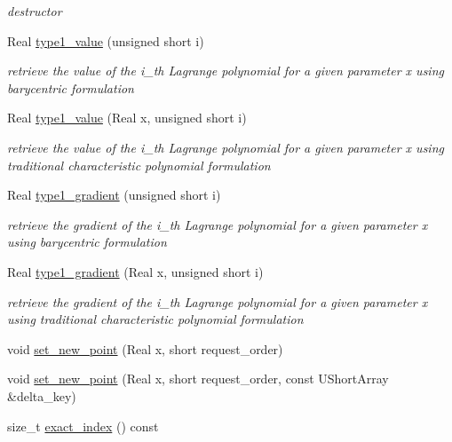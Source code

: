 \begin{DoxyCompactItemize}
\begin{DoxyCompactList}\small\item\em destructor \end{DoxyCompactList}\item 
Real \hyperlink{classPecos_1_1LagrangeInterpPolynomial_a2b603ac91089253b885e55fde37cd9c3}{type1\+\_\+value} (unsigned short i)
\begin{DoxyCompactList}\small\item\em retrieve the value of the i\+\_\+th Lagrange polynomial for a given parameter x using barycentric formulation \end{DoxyCompactList}\item 
Real \hyperlink{classPecos_1_1LagrangeInterpPolynomial_abb79c6ea3bd58a7ca9c4b3bfdd85be9c}{type1\+\_\+value} (Real x, unsigned short i)
\begin{DoxyCompactList}\small\item\em retrieve the value of the i\+\_\+th Lagrange polynomial for a given parameter x using traditional characteristic polynomial formulation \end{DoxyCompactList}\item 
Real \hyperlink{classPecos_1_1LagrangeInterpPolynomial_adc62caa2483812a460fa3bd6d5dd79df}{type1\+\_\+gradient} (unsigned short i)
\begin{DoxyCompactList}\small\item\em retrieve the gradient of the i\+\_\+th Lagrange polynomial for a given parameter x using barycentric formulation \end{DoxyCompactList}\item 
Real \hyperlink{classPecos_1_1LagrangeInterpPolynomial_a005465761c081a210eef9879ec5686f8}{type1\+\_\+gradient} (Real x, unsigned short i)
\begin{DoxyCompactList}\small\item\em retrieve the gradient of the i\+\_\+th Lagrange polynomial for a given parameter x using traditional characteristic polynomial formulation \end{DoxyCompactList}\item 
void \hyperlink{classPecos_1_1LagrangeInterpPolynomial_a676f72cadd45161151de088ca488af8a}{set\+\_\+new\+\_\+point} (Real x, short request\+\_\+order)
\item 
void \hyperlink{classPecos_1_1LagrangeInterpPolynomial_ac7d2c87832f8eb608a7d9b9d18013ead}{set\+\_\+new\+\_\+point} (Real x, short request\+\_\+order, const U\+Short\+Array \&delta\+\_\+key)
\item 
size\+\_\+t \hyperlink{classPecos_1_1LagrangeInterpPolynomial_aed1b9a98e9f80287b21581e7278aa253}{exact\+\_\+index} () const \label{classPecos_1_1LagrangeInterpPolynomial_aed1b9a98e9f80287b21581e7278aa253}


\end{DoxyCompactItemize}
